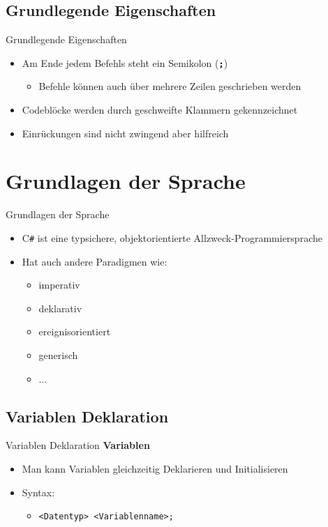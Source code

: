 \subsection{Grundlegende Eigenschaften}
\begin{frame}{Grundlegende Eigenschaften}
	\begin{itemize}
		\item Am Ende jedem Befehls steht ein Semikolon (\texttt{\alert{\textbf{;}}})
		\begin{itemize}
			\item Befehle können auch über mehrere Zeilen geschrieben werden
		\end{itemize}
		\item Codeblöcke werden durch geschweifte Klammern gekennzeichnet
		\item Einrückungen sind nicht zwingend aber hilfreich
	\end{itemize}
\end{frame}

\section{Grundlagen der Sprache}
\begin{frame}{Grundlagen der Sprache}
	\begin{itemize}
		\item C\texttt{\#} ist eine typsichere, objektorientierte Allzweck-Programmiersprache	
		\item Hat auch andere Paradigmen wie:
		\begin{itemize}
			\item imperativ
			\item deklarativ
			\item ereignisorientiert
			\item generisch
			\item ...
		\end{itemize}
	\end{itemize}	
\end{frame}

\subsection{Variablen Deklaration}
\begin{frame}{Variablen Deklaration}
	\textbf{Variablen}\\
		\begin{itemize}
			\item Man kann Variablen gleichzeitig Deklarieren und Initialisieren
			\item Syntax:
			\begin{itemize}			
				\item \texttt{\alert{<Datentyp> <Variablenname>};}
			\end{itemize}
		\end{itemize}
	
\end{frame}

